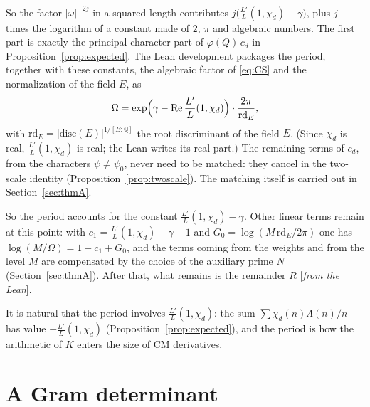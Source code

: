 \documentclass[11pt]{amsart}
\numberwithin{equation}{section}
\theoremstyle{definition}
\theoremstyle{remark}
\newcommand{\Q}{\mathbb Q}
\newcommand{\re}{\operatorname{Re}}
\newcommand{\status}[1]{\textup{[\emph{#1}]}}
\begin{document}
\begin{itemize}[leftmargin=2em]
So the factor $|\omega|^{-2j}$ in a squared length contributes $j\bigl(\frac{L'}{L}(1,\chi_d)-\gamma\bigr)$, plus $j$ times the logarithm of a constant made of $2$, $\pi$ and algebraic numbers. The first part is exactly the principal-character part of $\varphi(Q)\,c_d$ in Proposition~\ref{prop:expected}. The Lean development packages the period, together with these constants, the algebraic factor of \eqref{eq:CS} and the normalization of the field $E$, as
\begin{equation}\label{eq:LeanOmega}
 \Omega=\exp\Bigl(\gamma-\re\frac{L'}{L}(1,\chi_d)\Bigr)\cdot\frac{2\pi}{\mathrm{rd}_E},
\end{equation}
with $\mathrm{rd}_E=|\mathrm{disc}(E)|^{1/[E:\Q]}$ the root discriminant of the field $E$. (Since $\chi_d$ is real, $\frac{L'}L(1,\chi_d)$ is real; the Lean writes its real part.) The remaining terms of $c_d$, from the characters $\psi\ne\psi_0$, never need to be matched: they cancel in the two-scale identity (Proposition~\ref{prop:twoscale}). The matching itself is carried out in Section~\ref{sec:thmA}.
\end{itemize}
So the period accounts for the constant $\frac{L'}L(1,\chi_d)-\gamma$. Other linear terms remain at this point: with $c_1=\frac{L'}L(1,\chi_d)-\gamma-1$ and $G_0=\log(M\,\mathrm{rd}_E/2\pi)$ one has $\log(M/\Omega)=1+c_1+G_0$, and the terms coming from the weights and from the level $M$ are compensated by the choice of the auxiliary prime $N$ (Section~\ref{sec:thmA}). After that, what remains is the remainder $R$ \status{from the Lean}.

It is natural that the period involves $\frac{L'}{L}(1,\chi_d)$: the sum $\sum\chi_d(n)\Lambda(n)/n$ has value $-\frac{L'}{L}(1,\chi_d)$ (Proposition~\ref{prop:expected}), and the period is how the arithmetic of $K$ enters the size of CM derivatives.

\section{A Gram determinant}\label{sec:det}
\end{document}
